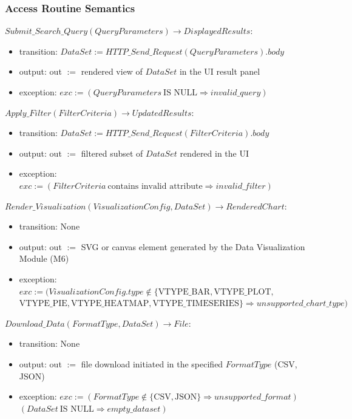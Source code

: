 \documentclass[12pt, titlepage]{article}
\begin{document}
\subsubsection{Access Routine Semantics}

\noindent $Submit\_Search\_Query(QueryParameters) \rightarrow DisplayedResults$:
\begin{itemize}
\item transition: $DataSet := HTTP\_Send\_Request(QueryParameters).body$
\item output: out $:= $ rendered view of $DataSet$ in the UI result panel
\item exception: $exc := (QueryParameters~\text{IS NULL} \Rightarrow invalid\_query)$
\end{itemize}

\noindent $Apply\_Filter(FilterCriteria) \rightarrow UpdatedResults$:
\begin{itemize}
\item transition: $DataSet := HTTP\_Send\_Request(FilterCriteria).body$
\item output: out $:= $ filtered subset of $DataSet$ rendered in the UI
\item exception: $exc := (FilterCriteria~\text{contains invalid attribute} \Rightarrow invalid\_filter)$
\end{itemize}

\noindent $Render\_Visualization(VisualizationConfig, DataSet) \rightarrow RenderedChart$:
\begin{itemize}
\item transition: None
\item output: out $:= $ SVG or canvas element generated by the Data Visualization Module (M6)
\item exception: $exc := (VisualizationConfig.type \notin \{\text{VTYPE\_BAR}, \text{VTYPE\_PLOT},$ \\
$\text{VTYPE\_PIE}, \text{VTYPE\_HEATMAP}, \text{VTYPE\_TIMESERIES}\} \Rightarrow unsupported\_chart\_type)$
\end{itemize}

\noindent $Download\_Data(FormatType, DataSet) \rightarrow File$:
\begin{itemize}
\item transition: None
\item output: out $:= $ file download initiated in the specified $FormatType$ (CSV, JSON)
\item exception: $exc := (FormatType \notin \{\text{CSV}, \text{JSON}\} \Rightarrow unsupported\_format)$ \\
$(DataSet~\text{IS NULL} \Rightarrow empty\_dataset)$
\end{itemize}
\end{document}
